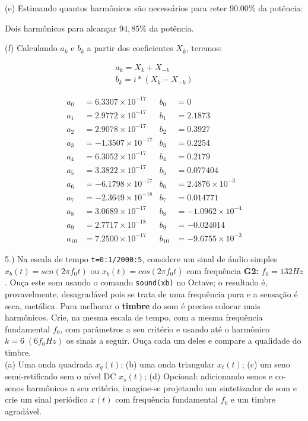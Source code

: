 \documentclass{article}
\begin{document}
(e) Estimando quantos harmônicos são necessários para reter $90.00\%$ da potência:

\vspace{\baselineskip}

Dois harmônicos para alcançar $94,85\% $ da potência.

\vspace{\baselineskip}

(f) Calculando $a_{k}$ e $b_{k}$ a partir dos coeficientes $X_{k}$, teremos:

\begin{align*}
    a_{k} = X_{k} + X_{-k}\\
    b_{k} = i*(X_{k} - X_{-k})
\end{align*}

\begin{align*}
    a_{0} &= 6.3307\times 10^{-17}   &   b_{0} &= 0\\
    a_{1} &= 2.9772\times 10^{-17}   &   b_{1} &= 2.1873\\
    a_{2} &= 2.9078\times 10^{-17}   &   b_{2} &= 0.3927\\
    a_{3} &= -1.3507\times 10^{-17}  &   b_{3} &= 0.2254\\
    a_{4} &= 6.3052\times 10^{-17}   &   b_{4} &= 0.2179\\
    a_{5} &= 3.3822\times 10^{-17}   &   b_{5} &= 0.077404\\
    a_{6} &= -6.1798\times 10^{-17}  &   b_{6} &= 2.4876\times 10^{-3}\\
    a_{7} &= -2.3649\times 10^{-18}  &   b_{7} &= 0.014771\\
    a_{8} &= 3.0689\times 10^{-17}   &   b_{8} &= -1.0962\times 10^{-4}\\
    a_{9} &= 2.7717\times 10^{-18}   &   b_{9} &= -0.024014\\
    a_{10} &= 7.2500\times 10^{-17}  &   b_{10} &= -9.6755\times 10^{-3}
\end{align*}

5.) Na escala de tempo {\tt t=0:1/2000:5}, considere um sinal de áudio simples $x_{b}(t) = sen(2 \pi f_{0}t)$ ou $x_{b}(t) = cos(2 \pi f_{0}t)$ com frequência \textbf{G2:} $f_{0} = 132Hz$. Ouça este som usando o comando {\tt sound(xb)} no Octave; o resultado é, provavelmente, desagradável pois se trata de uma frequência pura e a sensação é seca, metálica. Para melhorar o \textbf{timbre} do som é preciso colocar mais harmônicos. Crie, na mesma escala de tempo, com a mesma frequência fundamental $f_{0}$, com parâmetros a seu critério e usando até o harmônico $k = 6\;(6f_{0}Hz)$ os sinais a seguir. Ouça cada um deles e compare a qualidade do timbre.\\
(a) Uma onda quadrada $x_{q}(t)$;
(b) uma onda triangular $x_{t}(t)$;
(c) um seno semi-retificado sem o nível DC $x_{s}(t)$;
(d) Opcional: adicionando senos e co-senos harmônicos a seu critério, imagine-se projetando um sintetizador de som e crie um sinal periódico $x(t)$ com frequência fundamental $f_{0}$ e um timbre agradável.
\end{document}
